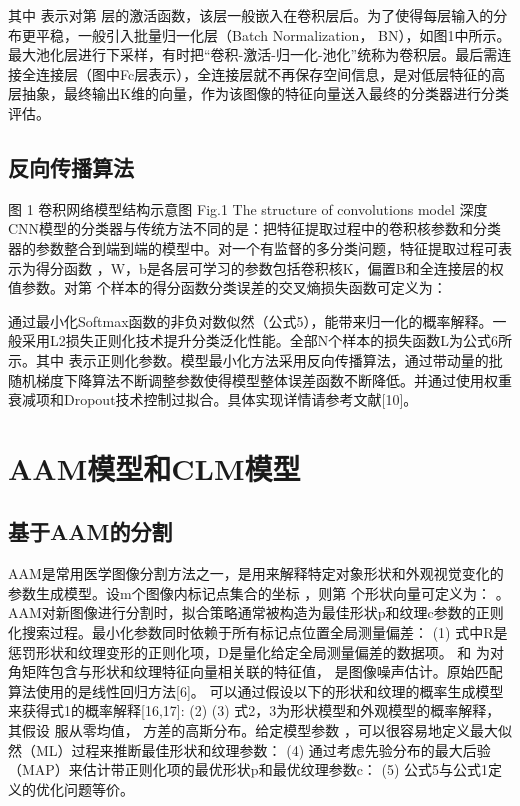 其中 表示对第 层的激活函数，该层一般嵌入在卷积层后。为了使得每层输入的分布更平稳，一般引入批量归一化层（Batch Normalization， BN），如图1中所示。最大池化层进行下采样，有时把“卷积-激活-归一化-池化”统称为卷积层。最后需连接全连接层（图中Fc层表示），全连接层就不再保存空间信息，是对低层特征的高层抽象，最终输出K维的向量，作为该图像的特征向量送入最终的分类器进行分类评估。

\subsection{反向传播算法} 
图 1 卷积网络模型结构示意图
Fig.1 The structure of convolutions model
深度CNN模型的分类器与传统方法不同的是：把特征提取过程中的卷积核参数和分类器的参数整合到端到端的模型中。对一个有监督的多分类问题，特征提取过程可表示为得分函数 ，W，b是各层可学习的参数包括卷积核K，偏置B和全连接层的权值参数。对第 个样本的得分函数分类误差的交叉熵损失函数可定义为：
  	 
通过最小化Softmax函数的非负对数似然（公式5），能带来归一化的概率解释。一般采用L2损失正则化技术提升分类泛化性能。全部N个样本的损失函数L为公式6所示。其中  表示正则化参数。模型最小化方法采用反向传播算法，通过带动量的批随机梯度下降算法不断调整参数使得模型整体误差函数不断降低。并通过使用权重衰减项和Dropout技术控制过拟合。具体实现详情请参考文献[10]。

\section{AAM模型和CLM模型} 
\subsection{基于AAM的分割} 
AAM是常用医学图像分割方法之一，是用来解释特定对象形状和外观视觉变化的参数生成模型。设m个图像内标记点集合的坐标  ，则第 个形状向量可定义为： 。 AAM对新图像进行分割时，拟合策略通常被构造为最佳形状p和纹理c参数的正则化搜索过程。最小化参数同时依赖于所有标记点位置全局测量偏差：
  (1)
式中R是惩罚形状和纹理变形的正则化项，D是量化给定全局测量偏差的数据项。 和 为对角矩阵包含与形状和纹理特征向量相关联的特征值， 是图像噪声估计。原始匹配算法使用的是线性回归方法[6]。
可以通过假设以下的形状和纹理的概率生成模型来获得式1的概率解释[16,17]:  
     (2)
	  	(3)
式2，3为形状模型和外观模型的概率解释，其假设  服从零均值， 方差的高斯分布。给定模型参数 ，可以很容易地定义最大似然（ML）过程来推断最佳形状和纹理参数：
  	      (4)
通过考虑先验分布的最大后验（MAP）来估计带正则化项的最优形状p和最优纹理参数c：
  (5)
公式5与公式1定义的优化问题等价。
